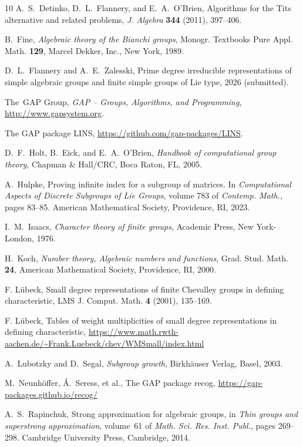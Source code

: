 \documentclass[11pt]{amsart}
\theoremstyle{definition}
\theoremstyle{remark}
\begin{document}
\begin{thebibliography}{10}
A.~S.~Detinko, D.~L.~Flannery, and E.~A.~O'Brien,
 Algorithms for the Tits alternative and related problems,
{\em J. Algebra} \textbf{344} (2011), 397--406.

B.~Fine,  \emph{Algebraic theory of the Bianchi groups}, 
Monogr. Textbooks Pure Appl. Math. \textbf{129},
Marcel Dekker, Inc., New York, 1989.

D.~L.~Flannery and A.~E.~Zalesski, Prime degree irreducible 
representations of simple algebraic groups and finite simple groups 
of Lie type, 2026 (submitted).

The~GAP Group, \emph{{GAP} -- {G}roups, {A}lgorithms, 
and {P}rogramming}, \url{http://www.gapsystem.org}.

 The GAP package LINS,
\url{https://github.com/gap-packages/LINS}.

D.~F.~Holt, B.~Eick, and E.~A.~O'Brien,
\emph{Handbook of computational group theory},
Chapman $\&$ Hall/CRC, Boca Raton, FL, 2005.

 A.~Hulpke,
Proving infinite index for a subgroup of matrices.
 In {\em Computational {A}spects  of {D}iscrete {S}ubgroups
 of {L}ie {G}roups}, volume 783 of {\em Contemp. Math.}, 
	pages 83--85. American Mathematical Society, Providence,
	RI, 2023.

I.~M.~Isaacs, {\em Character theory of finite groups},
Academic Press, New York-London, 1976.

H.~Koch, \emph{Number theory, Algebraic numbers and functions},
Grad. Stud. Math. \textbf{24}, American Mathematical Society, 
Providence, RI, 2000.

  F. L\"ubeck, Small degree representations of 
finite Chevalley groups in defining characteristic,   
LMS J. Comput. Math. \textbf{4} (2001), 135--169.

  F. L\"ubeck, Tables of weight multiplicities 
of small degree representations in defining characteristic, 
\url{https://www.math.rwth-aachen.de/~Frank.Luebeck/chev/WMSmall/index.html}

A.~Lubotzky and D.~Segal, \emph{Subgroup growth}, 
Birkh\"{a}user Verlag, Basel, 2003.

M.~Neunh\"{o}ffer, \'{A}.~Seress, et al., The GAP package recog, 
\url{https://gap-packages.github.io/recog/}

A.~S.~Rapinchuk, Strong approximation for algebraic groups,
in {\em Thin groups and superstrong approximation}, 
volume~61 of {\em Math. Sci. Res. Inst. Publ.}, 
pages 269--298. Cambridge University Press, Cambridge, 2014.


\end{thebibliography}
\end{document}
